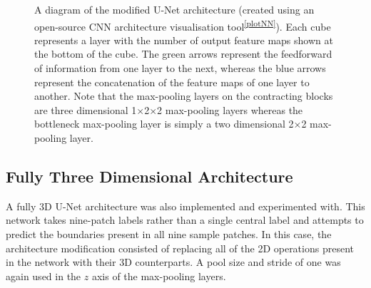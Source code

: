 \begin{figure}[!t]
    \centering
    \hspace*{-0.3cm}
    
    \caption[A diagram of the modified U-Net architecture (created using an open-source CNN architecture visualisation tool). Each cube represents a layer with the number of output feature maps shown at the bottom of the cube. The green arrows represent the feedforward of information from one layer to the next, whereas the blue arrows represent the concatenation of the feature maps of one layer to another.]{A diagram of the modified U-Net architecture (created using an open-source CNN architecture visualisation tool\textsuperscript{\ref{plotNN}}). Each cube represents a layer with the number of output feature maps shown at the bottom of the cube. The green arrows represent the feedforward of information from one layer to the next, whereas the blue arrows represent the concatenation of the feature maps of one layer to another. Note that the max-pooling layers on the contracting blocks are three dimensional 1$\times$2$\times$2 max-pooling layers whereas the bottleneck max-pooling layer is simply a two dimensional 2$\times$2 max-pooling layer.}
    \label{fig:unetushape3D}
\end{figure}



\subsection{Fully Three Dimensional Architecture}

A fully 3D U-Net architecture was also implemented and experimented with. This network takes nine-patch labels rather than a single central label and attempts to predict the boundaries present in all nine sample patches. In this case, the architecture modification consisted of replacing all of the 2D operations present in the network with their 3D counterparts. A pool size and stride of one was again used in the $z$ axis of the max-pooling layers.

